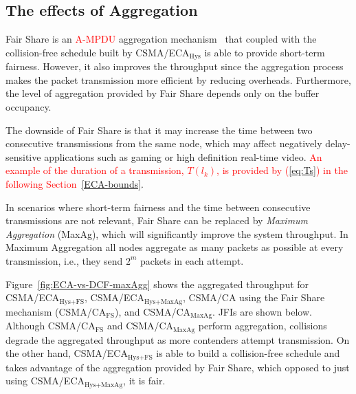 	\subsection{The effects of Aggregation}\label{effects-of-aggregation}
	Fair Share is an \textcolor{red}{A-MPDU} aggregation mechanism~\cite{A-MPDU} that coupled with the collision-free schedule built by CSMA/ECA$_{\text{Hys}}$ is able to provide short-term fairness. However, it also improves the throughput since the aggregation process makes the packet transmission more efficient by reducing overheads. Furthermore, the level of aggregation provided by Fair Share depends only on the buffer occupancy.
	
	The downside of Fair Share is that it may increase the time between two consecutive transmissions from the same node, which may affect negatively delay-sensitive applications such as gaming or high definition real-time video. \textcolor{red}{An example of the duration of a transmission, $T(l_{k})$, is provided by (\ref{eq:Ts}) in the following Section~\ref{ECA-bounds}}.
	
	In scenarios where short-term fairness and the time between consecutive transmissions are not relevant, Fair Share can be replaced by \emph{Maximum Aggregation} (MaxAg), which will significantly improve the system throughput. In Maximum Aggregation all nodes aggregate as many packets as possible at every transmission, i.e., they send $2^m$ packets in each attempt.

	Figure~\ref{fig:ECA-vs-DCF-maxAgg} shows the aggregated throughput for CSMA/ECA$_{\text{Hys+FS}}$, CSMA/ECA$_{\text{Hys+MaxAg}}$, CSMA/CA using the Fair Share mechanism (CSMA/CA$_{\text{FS}}$), and CSMA/CA$_{\text{MaxAg}}$. JFIs are shown below. Although CSMA/CA$_{\text{FS}}$ and CSMA/CA$_{\text{MaxAg}}$ perform aggregation, collisions degrade the aggregated throughput as more contenders attempt transmission. On the other hand, CSMA/ECA$_{\text{Hys+FS}}$ is able to build a collision-free schedule and takes advantage of the aggregation provided by Fair Share, which opposed to just using CSMA/ECA$_{\text{Hys+MaxAg}}$, it is fair.
	
	
